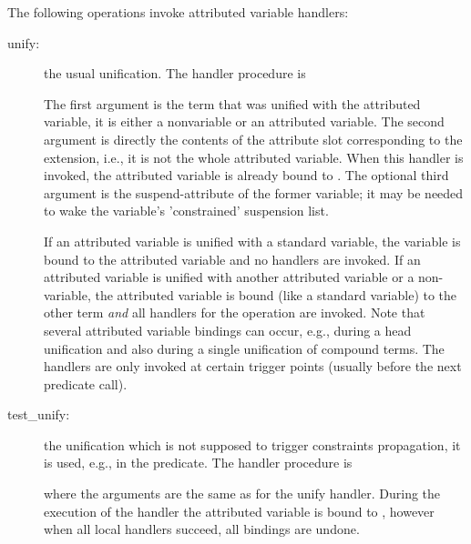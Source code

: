 The following operations invoke attributed variable handlers:

\begin{description}
\item [unify:]
  the usual unification.
The handler procedure is
\begin{quote}
\end{quote}
The first argument is the term that was unified with the attributed variable,
it is either a nonvariable or an attributed variable.
The second argument is directly the contents of the attribute slot
corresponding to the extension, i.e., it is not the whole attributed variable.
When this handler is invoked, the attributed variable is already bound
to .
The optional third argument is the suspend-attribute of the former
variable; it may be needed to wake the variable's 'constrained' suspension
list.

If an attributed variable is unified with a standard variable, the variable is
bound
to the attributed variable and no handlers are invoked.
If an attributed variable is unified with another attributed variable or a
non-variable,
the attributed variable is bound (like a standard variable) to the other term
\emph{and} all handlers for the  operation are invoked.
Note that several attributed variable bindings can occur, e.g., during a head
unification
and also during a single unification of compound terms.
The handlers are only invoked at certain trigger points (usually before the
next predicate call).

\item [test_unify:]
  the unification which is not supposed
to trigger constraints propagation, it is used, e.g.,
in the 
predicate.
The handler procedure is
\begin{quote}
\end{quote}
where the arguments are the same as for the unify handler.
During the execution of the handler the attributed variable is bound
to , however when all local handlers succeed,
all bindings are undone.


\end{description}
